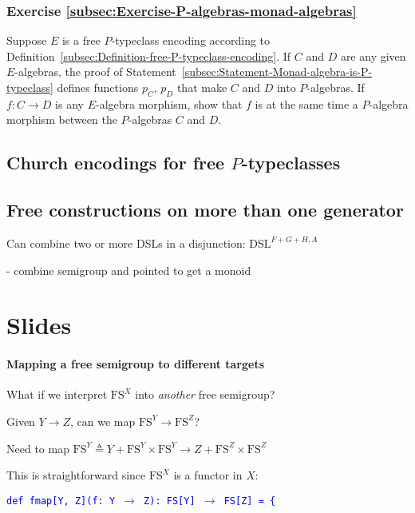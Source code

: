 \subsubsection{Exercise \label{subsec:Exercise-P-algebras-monad-algebras}\ref{subsec:Exercise-P-algebras-monad-algebras}}

Suppose $E$ is a free $P$-typeclass encoding according to Definition~\ref{subsec:Definition-free-P-typeclass-encoding}.
If $C$ and $D$ are any given $E$-algebras, the proof of Statement~\ref{subsec:Statement-Monad-algebra-is-P-typeclass}
defines functions $p_{C}$, $p_{D}$ that make $C$ and $D$ into
$P$-algebras. If $f:C\rightarrow D$ is any $E$-algebra morphism,
show that $f$ is at the same time a $P$-algebra morphism between
the $P$-algebras $C$ and $D$.

\subsection{Church encodings for free $P$-typeclasses\label{subsec:Church-encodings-for-free-P-typeclasses}}

\subsection{Free constructions on more than one generator}

Can combine two or more DSLs in a disjunction: $\text{DSL}^{F+G+H,A}$ 

- combine semigroup and pointed to get a monoid

\section{Slides }


\paragraph{Mapping a free semigroup to different targets}

What if we interpret $\text{FS}^{X}$ into \emph{another} free semigroup?

Given $Y\rightarrow Z$, can we map $\text{FS}^{Y}\rightarrow\text{FS}^{Z}$?

Need to map $\text{FS}^{Y}\triangleq Y+\text{FS}^{Y}\times\text{FS}^{Y}\rightarrow Z+\text{FS}^{Z}\times\text{FS}^{Z}$

This is straightforward since $\text{FS}^{X}$ is a functor in $X$:

\texttt{\textcolor{blue}{\footnotesize{}def fmap{[}Y, Z{]}(f: Y $\rightarrow$
Z): FS{[}Y{]} $\rightarrow$ FS{[}Z{]} = \{}}{\footnotesize\par}

